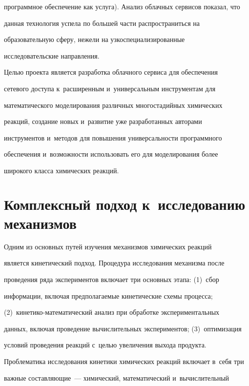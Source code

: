 программное обеспечение как услуга). Анализ облачных сервисов показал, что 


данная технология успела по большей части распространиться на 


образовательную сферу, нежели на узкоспециализированные 


исследовательские направления. 


  


  Целью проекта является разработка облачного сервиса для обеспечения 


сетевого доступа к~расширенным и~универсальным инструментам для 


математического моделирования различных многостадийных химических 


реакций, создание новых и~развитие уже разработанных авторами 


инструментов и~методов для повышения универсальности программного 


обеспечения и~возможности использовать его для моделирования более 


широкого класса химических реакций.


  


  \section{Комплексный подход к~исследованию механизмов}


  


  Одним из основных путей изучения механизмов химических реакций 


является кинетический подход. Процедура исследования механизма после 


проведения ряда экспериментов включает три основных этапа: (1)~сбор 


информации, включая предполагаемые кинетические схемы процесса; 


(2)~кинетико-ма\-те\-ма\-ти\-че\-ский анализ при обработке экспериментальных 


данных, включая проведение вычислительных экспериментов; (3)~оптимизация 


условий проведения реакций с~целью увеличения выхода продукта. 


Проблематика исследования кинетики химических реакций включает в~себя три 


важные составляющие~--- химический, математический и~вычислительный 


